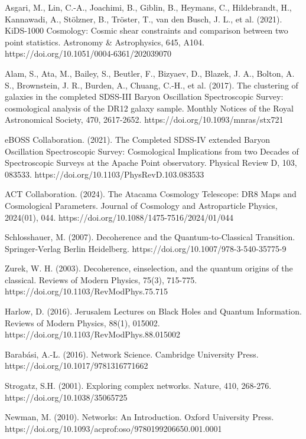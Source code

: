 \documentclass[11pt,english,twoside]{article}
\theoremstyle{plain}
\theoremstyle{definition}
\theoremstyle{remark}
\begin{document}
\begin{thebibliography}{99}
{ Asgari, M., Lin, C.-A., Joachimi, B., Giblin, B., Heymans, C., Hildebrandt, H., Kannawadi, A., Stölzner, B., Tröster, T., van den Busch, J. L., et al. (2021). KiDS-1000 Cosmology: Cosmic shear constraints and comparison between two point statistics. Astronomy \& Astrophysics, 645, A104. https://doi.org/10.1051/0004-6361/202039070

 Alam, S., Ata, M., Bailey, S., Beutler, F., Bizyaev, D., Blazek, J. A., Bolton, A. S., Brownstein, J. R., Burden, A., Chuang, C.-H., et al. (2017). The clustering of galaxies in the completed SDSS-III Baryon Oscillation Spectroscopic Survey: cosmological analysis of the DR12 galaxy sample. Monthly Notices of the Royal Astronomical Society, 470, 2617-2652. https://doi.org/10.1093/mnras/stx721

 eBOSS Collaboration. (2021). The Completed SDSS-IV extended Baryon Oscillation Spectroscopic Survey: Cosmological Implications from two Decades of Spectroscopic Surveys at the Apache Point observatory. Physical Review D, 103, 083533. https://doi.org/10.1103/PhysRevD.103.083533

 ACT Collaboration. (2024). The Atacama Cosmology Telescope: DR8 Maps and Cosmological Parameters. Journal of Cosmology and Astroparticle Physics, 2024(01), 044. https://doi.org/10.1088/1475-7516/2024/01/044

 Schlosshauer, M. (2007). Decoherence and the Quantum-to-Classical Transition. Springer-Verlag Berlin Heidelberg. https://doi.org/10.1007/978-3-540-35775-9

 Zurek, W. H. (2003). Decoherence, einselection, and the quantum origins of the classical. Reviews of Modern Physics, 75(3), 715-775. https://doi.org/10.1103/RevModPhys.75.715

 Harlow, D. (2016). Jerusalem Lectures on Black Holes and Quantum Information. Reviews of Modern Physics, 88(1), 015002. https://doi.org/10.1103/RevModPhys.88.015002

 Barabási, A.-L. (2016). Network Science. Cambridge University Press. https://doi.org/10.1017/9781316771662

 Strogatz, S.H. (2001). Exploring complex networks. Nature, 410, 268-276. https://doi.org/10.1038/35065725

 Newman, M. (2010). Networks: An Introduction. Oxford University Press. https://doi.org/10.1093/acprof:oso/9780199206650.001.0001

}
\end{thebibliography}
\end{document}
